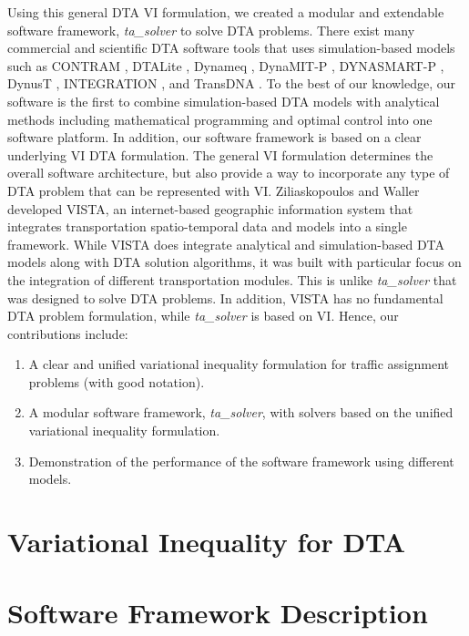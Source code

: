 \documentclass[conference]{IEEEtran}
\renewcommand{\:}{\mathrel{\coloneqq}}
\renewcommand{\=}{\ensuremath{\eqqcolon}}
\newcommand{\0}{\ensuremath{\boldsymbol{0}}}
\begin{document}
Using this general DTA VI formulation, we created a modular and extendable software framework, \textit{ta\_solver} to solve DTA problems. There exist many commercial and scientific DTA software tools that uses simulation-based models such as CONTRAM \cite{taylor2003contram}, DTALite \cite{zhou2014dtalite}, Dynameq \cite{mahut2010traffic}, DynaMIT-P \cite{DynaMIT,ben2001dynamit}, DYNASMART-P \cite{DYNASMART,mahmassani2004dynasmart}, DynusT \cite{chiu2011dynust}, INTEGRATION \cite{rakha2012integration}, and TransDNA \cite{TransDNA}. To the best of our knowledge, our software is the first
to combine simulation-based DTA models with analytical methods including mathematical programming and optimal control into one software platform. In addition, our software framework is based on a clear underlying VI DTA formulation. The general VI formulation determines the overall software architecture, but also provide a way to incorporate any type of DTA problem that can be represented with VI. Ziliaskopoulos and Waller developed VISTA,
an internet-based geographic information system that integrates transportation spatio-temporal data and models into a single framework. While VISTA does integrate analytical and simulation-based DTA models along with DTA solution algorithms, it was built with particular focus on the integration of different transportation modules. This is unlike \textit{ta\_solver} that was designed to solve DTA problems. In addition, VISTA has no fundamental DTA problem formulation, while \textit{ta\_solver} is based on VI. 
Hence, our contributions include:
\begin{enumerate}
    \item A clear and unified variational inequality formulation for traffic assignment problems (with good notation).
    \item A modular software framework, \textit{ta\_solver},  with solvers based on the unified variational inequality formulation.
    \item Demonstration of the performance of the software framework using different models.
\end{enumerate}

\section{Variational Inequality for DTA}

\section{Software Framework Description}
\end{document}
